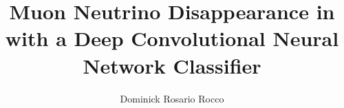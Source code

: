 \phd %
\draft

\title{Muon Neutrino Disappearance in \nova with
       a Deep Convolutional Neural Network Classifier}
\author{Dominick Rosario Rocco}


\abstract{}
\copyrightpage %
\acknowledgements{}
\dedication{}


\beforepreface

\figurespage
\tablespage

\afterpreface
